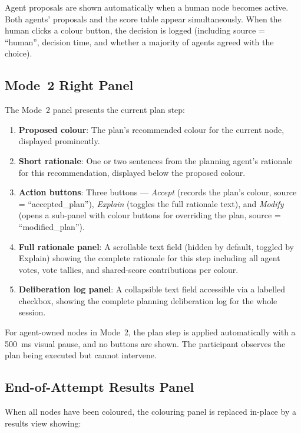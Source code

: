 \documentclass[11pt]{article}
\theoremstyle{definition}
\begin{document}
Agent proposals are shown automatically when a human node becomes active.  Both agents'
proposals and the score table appear simultaneously.  When the human clicks a colour
button, the decision is logged (including source = ``human'', decision time, and whether
a majority of agents agreed with the choice).

\subsection{Mode~2 Right Panel}

The Mode~2 panel presents the current plan step:

\begin{enumerate}[nosep]
  \item \textbf{Proposed colour}: The plan's recommended colour for the current node,
    displayed prominently.
  \item \textbf{Short rationale}: One or two sentences from the planning agent's
    rationale for this recommendation, displayed below the proposed colour.
  \item \textbf{Action buttons}: Three buttons --- \textit{Accept} (records the plan's
    colour, source = ``accepted\_plan''), \textit{Explain} (toggles the full rationale
    text), and \textit{Modify} (opens a sub-panel with colour buttons for overriding
    the plan, source = ``modified\_plan'').
  \item \textbf{Full rationale panel}: A scrollable text field (hidden by default,
    toggled by Explain) showing the complete rationale for this step including all agent
    votes, vote tallies, and shared-score contributions per colour.
  \item \textbf{Deliberation log panel}: A collapsible text field accessible via a
    labelled checkbox, showing the complete planning deliberation log for the whole
    session.
\end{enumerate}

For agent-owned nodes in Mode~2, the plan step is applied automatically with a 500~ms
visual pause, and no buttons are shown.  The participant observes the plan being executed
but cannot intervene.

\subsection{End-of-Attempt Results Panel}

When all nodes have been coloured, the colouring panel is replaced in-place by a results
view showing:
\end{document}

